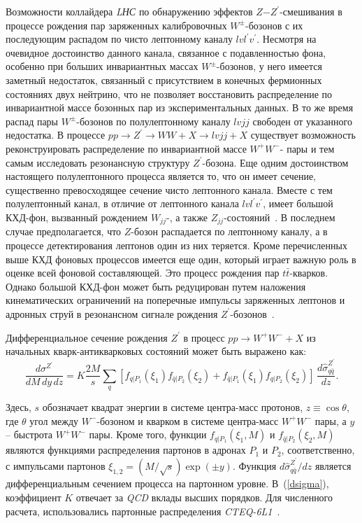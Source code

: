 Возможности коллайдера \textit{LНС} по обнаружению эффектов $Z$−$Z^\prime$-смешивания в процессе рождения пар заряженных калибровочных $W^±$-бозонов с их последующим распадом по чисто лептонному каналу $lvl^\prime v^\prime$. Несмотря на очевидное достоинство данного канала, связанное с подавленностью фона, особенно при больших инвариантных массах $W^±$-бозонов, у него имеется заметный недостаток, связанный с присутствием в конечных фермионных состояниях двух нейтрино, что не позволяет восстановить распределение по инвариантной массе бозонных пар из экспериментальных данных. В то же время распад пары $W^±$-бозонов по полулептонному каналу $lvjj$ свободен от указанного недостатка. В процессе $pp \rightarrow Z^\prime \rightarrow WW + X \rightarrow lvjj + X$ существует возможность реконструировать распределение по инвариантной массе $W^+W^-$- пары и тем самым исследовать резонансную структуру $Z^\prime$-бозона. Еще одним достоинством настоящего полулептонного процесса является то, что он имеет сечение, существенно превосходящее сечение чисто лептонного канала. Вместе с тем полулептонный канал, в отличие от лептонного канала $lvl^\prime v^\prime$, имеет большой КХД-фон, вызванный рождением $W_{jj}$-, а также $Z_{jj}$-состояний~\cite{ada-lvlv:2013}. В последнем случае предполагается, что $Z$-бозон распадается по лептонному каналу, а в процессе детектирования лептонов один из них теряется. Кроме перечисленных выше КХД фоновых процессов имеется еще один, который играет важную роль в оценке всей фоновой составляющей. Это процесс рождения пар $t\bar{t}$-кварков. Однако большой КХД-фон может быть редуцирован путем наложения кинематических ограничений на поперечные импульсы заряженных лептонов и адронных струй в резонансном сигнале рождения $Z^\prime$-бозонов~\cite{Bobovnikov:2016}.


Дифференциальное сечение рождения ${Z}^{\prime}$ в процесс $pp \rightarrow W^+W^- + X$ из начальных кварк-антикварковых состояний может быть выражено как:
\begin{equation} \label{dsigma}
\frac{d\sigma^{Z^\prime}}{dM\,dy\,dz}
= K \frac{2 M}{s}
\sum_q [f_{q|P_1}(\xi_1)f_{\bar q|P_2}(\xi_2) + f_{\bar
	q|P_1}(\xi_1)f_{q|P_2}(\xi_2)]\, \frac{d\hat \sigma_{q \bar
		q}^{Z^\prime}}{dz}.
\end{equation}

Здесь, $s$ обозначает квадрат энергии в системе центра-масс протонов,
$z\equiv\cos\theta$, где $\theta$ угол между $W^-$-бозоном и кварком в системе центра-масс $W^+W^-$  пары, а $y$ -- быстрота $W^+W^-$ пары. Кроме того, функции $f_{q|P_1}(\xi_{1},M)$ и $f_{\bar
	q|P_2}(\xi_{2},M)$ являются функциями распределения партонов в адронах $P_1$ и $P_2$, соответственно, с импульсами партонов $\xi_{1,2}=(M/\sqrt
s)\exp(\pm y)$. Функция ${d\hat
	\sigma_{q \bar q}^{Z^\prime}}/{dz}$ является дифференциальным 
 сечением процесса на партонном уровне. В~(\ref{dsigma}), коэффициент $K$ отвечает за \textit{QCD} вклады высших порядков.
Для численного расчета, использовались партонные распределения \textit{CTEQ-6L1}~\cite{2part-pankov}.

